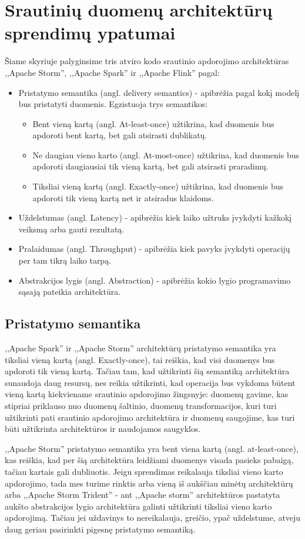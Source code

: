 \documentclass{VUMIFPSkursinis}
\begin{document}
\section{Srautinių duomenų architektūrų sprendimų ypatumai} \label{srautarch}
Šiame skyriuje palyginsime tris atviro kodo srautinio apdorojimo architektūras ,,Apache Storm'', ,,Apache Spark'' ir ,,Apache Flink'' pagal:
\begin{itemize}
    \item Pristatymo semantika (angl. delivery semantics) - apibrėžia pagal kokį modelį bus pristatyti duomenis. Egzistuoja trys semantikos\cite{ensar20}: 
    \begin{itemize}
        \item Bent vieną kartą (angl. At-least-once) užtikrina, kad duomenis bus apdoroti bent kartą, bet gali atsirasti dublikatų. 
        \item Ne daugiau vieno karto (angl. At-most-once) užtikrina, kad duomenis bus apdoroti daugiausiai tik vieną kartą, bet gali atsirasti praradimų. 
        \item Tiksliai vieną kartą (angl. Exactly-once) užtikrina, kad duomenis bus apdoroti tik vieną kartą net ir atsiradus klaidoms.
    \end{itemize}
    \item Uždelstumas (angl. Latency) - apibrėžia kiek laiko užtruks įvykdyti kažkokį veiksmą arba gauti rezultatą.
    \item Pralaidumas (angl. Throughput) - apibrėžia kiek pavyks įvykdyti operacijų per tam tikrą laiko tarpą.
    \item Abstrakcijos lygis (angl. Abstraction) - apibrėžia kokio lygio programavimo sąsają pateikia architektūra.
\end{itemize}

\subsection{Pristatymo semantika}
,,Apache Spark'' ir ,,Apache Storm'' architektūrų pristatymo semantika yra tiksliai vieną kartą (angl. Exactly-once), tai reiškia, kad visi 
duomenys bus apdoroti tik vieną kartą. Tačiau tam, kad užtikrinti šią semantiką architektūra sunaudoja daug resursų, nes reikia užtikrinti, kad 
operacija bus vykdoma būtent vieną kartą kiekviename srautinio apdorojimo žingsnyje: duomenų gavime, kas stipriai priklauso nuo duomenų šaltinio,
duomenų transformacijos, kuri turi užtikrinti pati srautinio apdorojimo architektūra ir duomenų saugojime, kas turi būti užtikrinta architektūros ir
naudojamos saugyklos\cite{zhang20}.\par
    ,,Apache Storm'' pristatymo semantika yra bent viena kartą (angl. at-least-once), kas reiškia, kad per šią architektūra leidžiami duomenys 
visada pasieks pabaigą, tačiau kartais gali dubliuotis\cite{prithi20}. Jeigu sprendimas reikalauja tiksliai vieno karto apdorojimo, tada mes turime rinktis arba vieną 
iš aukščiau minėtų architektūrų arba ,,Apache Storm Trident'' - ant ,,Apache storm'' architektūros pastatyta aukšto abstrakcijos lygio architektūra 
galinti užtikrinti tiksliai vieno karto apdorojimą. Tačiau jei uždavinys to nereikalauja, greičio, ypač uždelstume, atveju daug geriau pasirinkti 
pigesnę pristatymo semantiką\cite{zhang20}.
\end{document}
